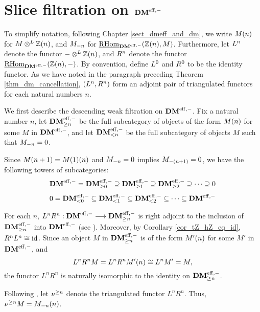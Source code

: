 \section{Slice filtration on $\DMeff$}
\label{sect_slice_filtration_DMeff}
To simplify notation, following Chapter \ref{sect_dmeff_and_dm},
we write $\tZ[n]{M}$ for $M \tDM \Z(n)$, and $\hZ[n]{M}$ for 
$\ihomDMf(\Z(n), M)$. Furthermore, let $\LDMf{n}$ denote the
functor $- \tDM \Z(n)$, and $\RDMf{n}$ denote the functor 
$\ihomDMf(\Z(n), -)$. By convention, define $\LDMf{0}$ and 
$\RDMf{0}$ to be the identity functor. As we have noted in
the paragraph preceding Theorem \ref{thm_dm_cancellation}, 
$(\LDMf{n}, \RDMf{n})$ form an adjoint pair of triangulated 
functors for each natural numbers $n$.

We first describe the descending weak filtration on $\DMeff$. Fix
a natural number $n$, let $\GFiltDM[n]{\DMeff}$ be the full 
subcategory of objects of the form $\tZ[n]{M}$ for some $M$ in 
$\DMeff$, and let $\LFiltDM[n]{\DMeff}$ be the full subcategory of 
objects $M$ such that $\hZ[n]{M} = 0$.

Since $\tZ[n + 1]{M} = \tZ[n]{\tZ[1]{M}}$ and $\hZ[n]{M} = 0$ 
implies $\hZ[(n + 1)]{M} = 0$, we have the following towers of 
subcategories:
\begin{equation}\label{eq_gslice_tower_DMeff}
\DMeff = \GFiltDM[0]{\DMeff} \supseteq \GFiltDM[1]{\DMeff} 
   \supseteq \GFiltDM[2]{\DMeff} \supseteq \cdots \supseteq 0
\end{equation}
\begin{equation}\label{eq_lslice_tower_DMeff}
0 = \LFiltDM[0]{\DMeff} \subseteq \LFiltDM[1]{\DMeff} \subseteq 
   \LFiltDM[2]{\DMeff} \subseteq \cdots \subseteq \DMeff
\end{equation}

For each $n$, $L^n R^n : \DMeff \to \GFiltDM[n]{\DMeff}$ is right
adjoint to the inclusion of $\GFiltDM[n]{\DMeff}$ into $\DMeff$
(see \cite[1.1]{HuKa}). Moreover, by Corollary 
\ref{cor_tZ_hZ_eq_id}, $R^nL^n \cong \id$. Since an object $M$ in 
$\GFiltDM[n]{\DMeff}$ is of the form $\tZ[n]{M'}$ for some $M'$ in 
$\DMeff$, and
\[
L^nR^n M = L^nR^n \tZ[n]{M'} \cong L^n M' = M,
\]
the functor $L^nR^n$ is naturally isomorphic to the identity on
$\GFiltDM[n]{\DMeff}$. 

\begin{defn}\label{def_sgDM}
Following \cite{HuKa}, let $\sgDM{n}$ denote the triangulated functor
$L^nR^n$. Thus, $\sgDM{n}M=\LHI[n]{\RHI[n]{M}}$. 
\end{defn}


